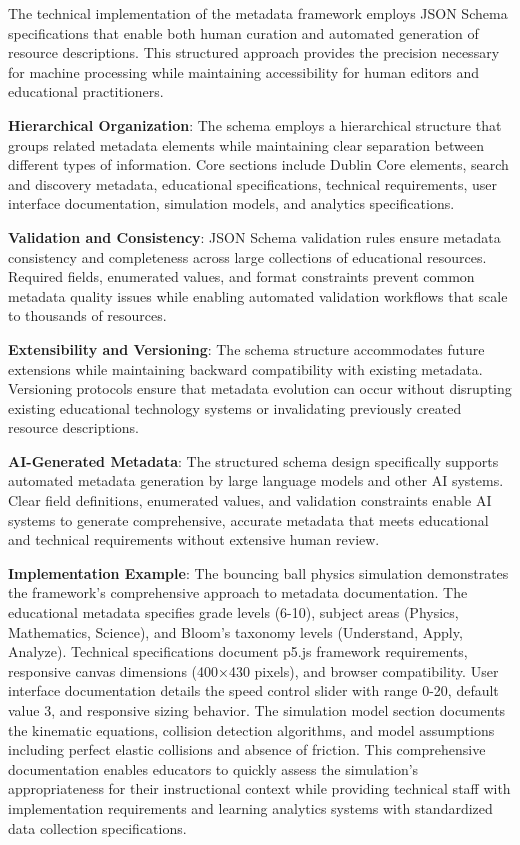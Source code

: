 The technical implementation of the metadata framework employs JSON Schema specifications that enable both human curation and automated generation of resource descriptions. This structured approach provides the precision necessary for machine processing while maintaining accessibility for human editors and educational practitioners.

\textbf{Hierarchical Organization}: The schema employs a hierarchical structure that groups related metadata elements while maintaining clear separation between different types of information. Core sections include Dublin Core elements, search and discovery metadata, educational specifications, technical requirements, user interface documentation, simulation models, and analytics specifications.

\textbf{Validation and Consistency}: JSON Schema validation rules ensure metadata consistency and completeness across large collections of educational resources. Required fields, enumerated values, and format constraints prevent common metadata quality issues while enabling automated validation workflows that scale to thousands of resources.

\textbf{Extensibility and Versioning}: The schema structure accommodates future extensions while maintaining backward compatibility with existing metadata. Versioning protocols ensure that metadata evolution can occur without disrupting existing educational technology systems or invalidating previously created resource descriptions.

\textbf{AI-Generated Metadata}: The structured schema design specifically supports automated metadata generation by large language models and other AI systems. Clear field definitions, enumerated values, and validation constraints enable AI systems to generate comprehensive, accurate metadata that meets educational and technical requirements without extensive human review.

\textbf{Implementation Example}: The bouncing ball physics simulation demonstrates the framework's comprehensive approach to metadata documentation. The educational metadata specifies grade levels (6-10), subject areas (Physics, Mathematics, Science), and Bloom's taxonomy levels (Understand, Apply, Analyze). Technical specifications document p5.js framework requirements, responsive canvas dimensions (400×430 pixels), and browser compatibility. User interface documentation details the speed control slider with range 0-20, default value 3, and responsive sizing behavior. The simulation model section documents the kinematic equations, collision detection algorithms, and model assumptions including perfect elastic collisions and absence of friction. This comprehensive documentation enables educators to quickly assess the simulation's appropriateness for their instructional context while providing technical staff with implementation requirements and learning analytics systems with standardized data collection specifications.

